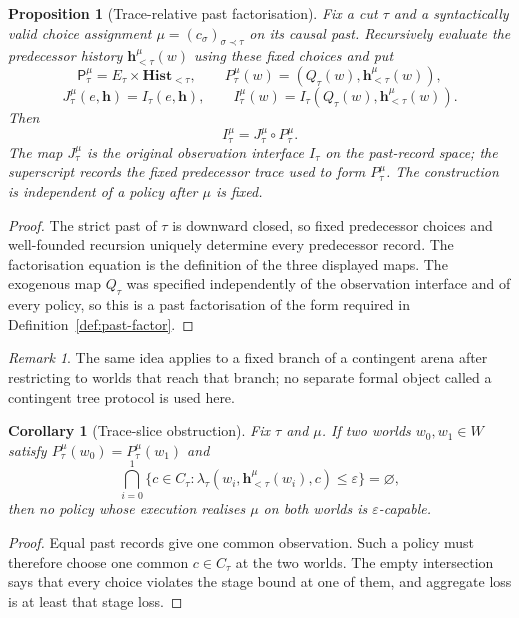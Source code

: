 \documentclass[11pt]{article}
\theoremstyle{plain}
\newtheorem{proposition}[theorem]{Proposition}
\newtheorem{corollary}[theorem]{Corollary}
\theoremstyle{definition}
\theoremstyle{remark}
\newtheorem{remark}[theorem]{Remark}
\newcommand{\eps}{\varepsilon}
\begin{document}
\begin{proposition}[Trace-relative past factorisation]
\label{prop:trace-relative-past}
Fix a cut $\tau$ and a syntactically valid choice assignment
$\mu=(c_\sigma)_{\sigma\prec\tau}$ on its causal past. Recursively evaluate the
predecessor history $\mathbf h_{<\tau}^\mu(w)$ using these fixed choices and
put
\[
\mathsf P_\tau^\mu=E_\tau\times\mathbf{Hist}_{<\tau},
\qquad
P_\tau^\mu(w)=(Q_\tau(w),\mathbf h_{<\tau}^\mu(w)),
\]
\[
J_\tau^\mu(e,\mathbf h)=I_\tau(e,\mathbf h),
\qquad
I_\tau^\mu(w)=I_\tau(Q_\tau(w),\mathbf h_{<\tau}^\mu(w)).
\]
Then
\[
I_\tau^\mu=J_\tau^\mu\circ P_\tau^\mu.
\]
The map $J_\tau^\mu$ is the original observation interface $I_\tau$ on the
past-record space; the superscript records the fixed predecessor trace used to
form $P_\tau^\mu$. The construction is independent of a policy after $\mu$ is
fixed.
\end{proposition}

\begin{proof}
The strict past of $\tau$ is downward closed, so fixed predecessor choices and
well-founded recursion uniquely determine every predecessor record. The
factorisation equation is the definition of the three displayed maps. The
exogenous map $Q_\tau$ was specified independently of the observation interface
and of every policy, so this is a past factorisation of the form required in
Definition~\ref{def:past-factor}.
\end{proof}

\begin{remark}
The same idea applies to a fixed branch of a contingent arena after restricting
to worlds that reach that branch; no separate formal object called a contingent
tree protocol is used here.
\end{remark}

\begin{corollary}[Trace-slice obstruction]
\label{cor:trace-slice-obstruction}
Fix $\tau$ and $\mu$. If two worlds $w_0,w_1\in W$ satisfy
$P_\tau^\mu(w_0)=P_\tau^\mu(w_1)$ and
\[
\bigcap_{i=0}^1
\{c\in C_\tau:
\lambda_\tau(w_i,\mathbf h_{<\tau}^\mu(w_i),c)\le\eps\}
=\varnothing,
\]
then no policy whose execution realises $\mu$ on both worlds is
$\eps$-capable.
\end{corollary}

\begin{proof}
Equal past records give one common observation. Such a policy must therefore
choose one common $c\in C_\tau$ at the two worlds. The empty intersection says
that every choice violates the stage bound at one of them, and aggregate loss is
at least that stage loss.
\end{proof}
\end{document}
